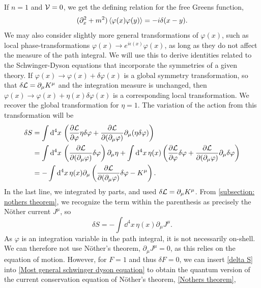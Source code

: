 %
If $n = 1$ and $\mathcal V = 0$, we get the defining relation for the free Greens function,
%
\begin{equation}
    (\partial^2_x + m^2)\braket{\varphi(x)\varphi(y)}
    = -i \delta(x - y).
\end{equation}
%
We may also consider slightly more general transformations of $\varphi(x)$, such as local phase-transformations $\varphi(x) \rightarrow e^{i\epsilon(x)}\varphi(x)$, as long as they do not affect the measure of the path integral.
We will use this to derive identities related to the Schwinger-Dyson equations that incorporate the symmetries of a given theory.
If $\varphi(x) \rightarrow \varphi(x) + \delta \varphi(x)$ is a global symmetry transformation, so that $\delta \mathcal L = \partial_\mu K^\mu$ and the integration measure is unchanged, then $\varphi(x) \rightarrow \varphi(x) + \eta(x) \delta \varphi(x)$ is a corresponding local transformation.
We recover the global transformation for $\eta = 1$.
The variation of the action from this transformation will be
%
\begin{align}
    \nonumber
    \delta S 
    &= 
    \int \dd^4 x \,
    \left(
        \pdv{\Ell}{\varphi} \eta \delta \varphi
        + \pdv{\Ell}{(\partial_\mu\varphi) } \partial_\mu (\eta \delta \varphi)
    \right)\\
    \nonumber
    & =
    \int \dd^4 x \, \left( \pdv{\Ell}{(\partial_\mu \varphi)} \delta \varphi \right) \partial_\mu \eta
    + \int \dd^4 x \, \eta(x)
    \left( 
        \pdv{\Ell}{\varphi} \delta \varphi 
        + \pdv{\Ell}{(\partial_\mu \varphi)} \partial_\mu \delta \varphi  
    \right)\\
    \nonumber
    &=
    - \int \dd^4 x \, \eta(x) \partial_\mu 
    \left(  \pdv{\Ell}{(\partial_\mu \varphi)} \delta \varphi - K^\mu \right).
\end{align}
%
In the last line, we integrated by parts, and used $\delta \mathcal L = \partial_\mu K^\mu$.
From \autoref{subsection: nothers theorem}, we recognize the term within the parenthesis as precisely the Nöther current $J^\mu$, so
%
\begin{equation}
    \label{delta S} 
    \delta S = - \int \dd^4 x \, \eta(x) \partial_\mu J^\mu.
\end{equation}
%
As $\varphi$ is an integration variable in the path integral, it is not necessarily on-shell.
We can therefore not use Nöther's theorem, $\partial_\mu J^\mu = 0$, as this relies on the equation of motion.
However, for $F = 1$ and thus $\delta F = 0$, we can insert \autoref{delta S} into \autoref{Most general schwinger dyson equation} to obtain the quantum version of the current conservation equation of Nöther's theorem, \autoref{Nothers theorem},
